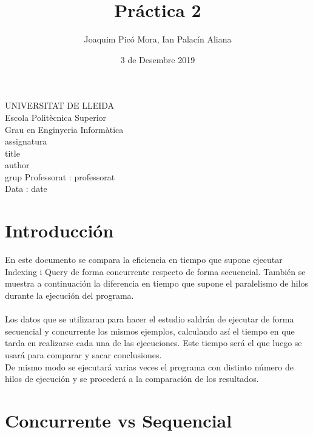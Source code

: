 \documentclass{article}
\title{Práctica 2}
\author{Joaquim Picó Mora, Ian Palacín Aliana}
\date{3 de Desembre 2019}
\renewcommand{\maketitle}{ %
	\begin{titlepage}
		\raggedright{UNIVERSITAT DE LLEIDA \\
			Escola Politècnica Superior \\
			Grau en Enginyeria Informàtica\\
			\1assignatura\\}
		\vspace{5cm}
		\centering\huge{\5title \\}
		\vspace{3cm}
		\large{\6author} \\
		\normalsize{\3grup}
		\vfill
		Professorat : \4professorat \\
		Data : \7date
\end{titlepage}}
\begin{document}
	\maketitle
	\thispagestyle{empty}
	
	\newpage
	\tableofcontents
	\newpage
	




\section{Introducción}

En este documento se compara la eficiencia en tiempo que supone ejecutar Indexing i Query de forma concurrente respecto de forma secuencial. También se muestra a continuación la diferencia en tiempo que supone el paralelismo de hilos durante la ejecución del programa.
\\\\
Los datos que se utilizaran para hacer el estudio saldrán de ejecutar de forma secuencial y concurrente los mismos ejemplos, calculando así el tiempo en que tarda en realizarse cada una de las ejecuciones. Este tiempo será el que luego se usará para comparar y sacar conclusiones.\\
De mismo modo se ejecutará varias veces el programa con distinto número de hilos de ejecución y se procederá a la comparación de los resultados.


\section{Concurrente vs Sequencial}
\end{document}
